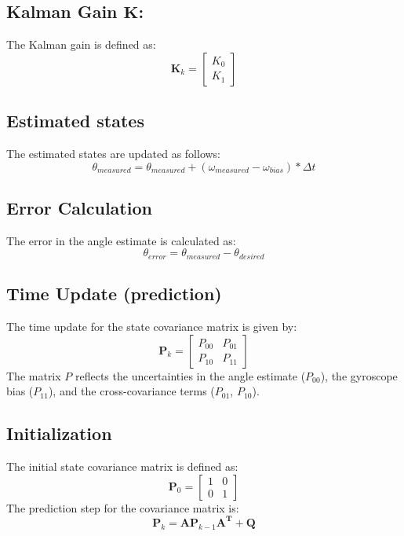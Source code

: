 \begin{appendices}
\subsection{Kalman Gain $\mathbf{K}$:}
The Kalman gain is defined as:
\begin{equation}
	\mathbf{K}_k = \begin{bmatrix} K_{0} \\ K_{1} \end{bmatrix}  \label{eq:eq}
\end{equation}


\subsection{Estimated states}
The estimated states are updated as follows:
\begin{equation}
	\theta_{measured} = \theta_{measured} + (\omega_{measured} - \omega_{bias}) * \Delta t  \label{eq:eq}
\end{equation}


\subsection{Error Calculation}
The error in the angle estimate is calculated as:
\begin{equation} 
	\theta_{error} = \theta_{measured} - \theta_{desired}  \label{eq:eq} 
\end{equation}

\subsection{Time Update (prediction)}
The time update for the state covariance matrix is given by:
\begin{equation}
	\mathbf{P}_k = \begin{bmatrix} P_{00} & P_{01} \\ P_{10} & P_{11} \end{bmatrix}  \label{eq:eq}
\end{equation}
The matrix $P$ reflects the uncertainties in the angle estimate ($P_{00}$), the gyroscope bias ($P_{11}$), and the cross-covariance terms ($P_{01}$, $P_{10}$).


\subsection{Initialization}
The initial state covariance matrix is defined as:
\begin{equation}
	\mathbf{P}_0 = \begin{bmatrix} 1 & 0 \\ 0 & 1 \end{bmatrix}  \label{eq:eq}
\end{equation}
The prediction step for the covariance matrix is:
\begin{equation}
	\mathbf{P}_k = \mathbf{A} \mathbf{P}_{k-1} \mathbf{A^T} + \mathbf{Q}  \label{eq:eq}
\end{equation}


\end{appendices}
